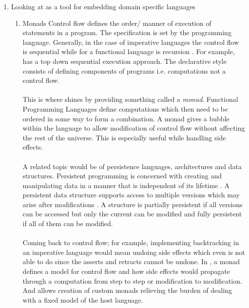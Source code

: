 \documentclass[proposal.tex]{subfiles}
\begin{document}
\begin{enumerate}
\item Looking at  as a tool for embedding domain specific languages\cite{website:paulspontifications}

\begin{enumerate}
\item Monads
\newline  
Control flow defines the order/ manner of execution of statements in a program\cite{website:controlflowwiki}. The specification is set by 
the programming language. Generally, in the case of imperative languages the control flow is sequential while for a functional language
is recursion \cite{website:controlflowdalhousie}. For example,  has a top down sequential execution approach. The 
declarative style consists of defining components of programs i.e. computations not a control 
flow\cite{website:declarativeprogrammingwiki}.     

\paragraph{} 
This is where  shines by providing something called a \textit{monad}. Functional Programming Languages 
define computations which then need to be ordered in some way to form a combination\cite{website:monadascomputation}. A monad gives a 
bubble within the language to allow modification of control flow without affecting the rest of the universe. This is especially 
useful while handling side effects. 

\paragraph{}
A related topic would be of persistence languages, architectures and data structures. Persistent programming is concerned with creating and 
manipulating data in a manner that is independent of its lifetime \cite{morrison1990persistent}. A persistent data structure supports 
access to multiple versions which may arise after modifications \cite{driscoll1986making, website:persistentdatastructuresmit}. A structure 
is partially persistent if all versions can be accessed but only the current can be modified and fully persistent if all of them can be 
modified.       

\paragraph{}
Coming back to control flow; for example, implementing backtracking in an imperative language would mean undoing side effects which even 
 is not able to do since the asserts and retracts cannot be undone. In , a monad defines a model for 
control flow and how side effects would propagate through a computation from step to step or modification to modification. And
 allows creation of custom monads relieving the burden of dealing with a fixed model of the host language.     


\end{enumerate}
\end{enumerate}
\end{document}
